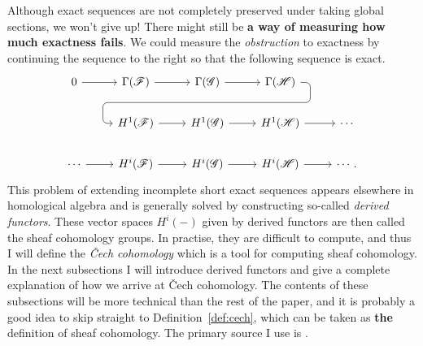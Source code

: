 Although exact sequences are not completely preserved under taking
global sections, we won't give up! There might still be \textbf{a way of
measuring how much exactness fails}. We could measure the
\emph{obstruction} to exactness by continuing the sequence to the right
so that the following sequence is exact.
\[
\begin{tikzcd}
  0 \rar & \Gamma(\mathscr{F}) \rar & \Gamma(\mathscr{G})
  \rar\dar[phantom, ""{coordinate, name=Z}] & \Gamma(\mathscr{H})
  \arrow[rounded corners, to path={ -- ([xshift=2ex]\tikztostart.east)
    |- (Z) -| ([xshift=-2ex]\tikztotarget.west) -- (\tikztotarget)},
  overlay]{dll} & \\
    & H^{1}(\mathscr{F}) \rar & H^{1}(\mathscr{G})
  \rar & H^{1}(\mathscr{H}) \rar & \cdots \\
  \cdots \rar& H^{i}(\mathscr{F}) \rar & H^{i}(\mathscr{G})
  \rar & H^{i}(\mathscr{H}) \rar & \cdots.
\end{tikzcd}
\]
This problem of extending incomplete short exact sequences appears
elsewhere in homological algebra and is generally solved by constructing
so-called \emph{derived functors}. These vector spaces $H^{i}(-)$ given by
derived functors are then called the sheaf cohomology groups. In practise,
they are difficult to compute, and thus I will define the \emph{\v Cech
  cohomology} which is a tool for computing sheaf cohomology.
In the next subsections I will introduce derived functors and give a complete
explanation of how we arrive at \v Cech cohomology. The contents of these
subsections will be more technical than the rest of the paper, and it is
probably a good idea to skip straight to Definition~\ref{def:cech},
which can be taken as \textbf{the} definition of sheaf cohomology. The
primary source I use is \cite{vakil}.

